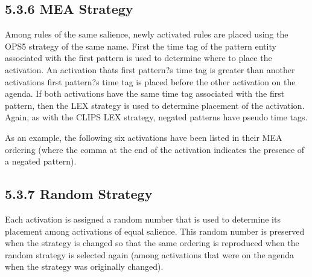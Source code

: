 \documentclass[letterpaper,10pt,english]{sphinxmanual}
\begin{document}
\subsection{5.3.6 MEA Strategy}
\label{\detokenize{defrule:mea-strategy}}
Among rules of the same salience, newly activated rules are placed using
the OPS5 strategy of the same name. First the time tag of the pattern
entity associated with the first pattern is used to determine where to
place the activation. An activation thats first pattern?s time tag is
greater than another activations first pattern?s time tag is placed
before the other activation on the agenda. If both activations have the
same time tag associated with the first pattern, then the LEX strategy
is used to determine placement of the activation. Again, as with the
CLIPS LEX strategy, negated patterns have pseudo time tags.

As an example, the following six activations have been listed in their
MEA ordering (where the comma at the end of the activation indicates the
presence of a negated pattern).

\begin{sphinxVerbatim}[commandchars=\\\{\}]
 
 
 
 
 
 
\end{sphinxVerbatim}


\subsection{5.3.7 Random Strategy}
\label{\detokenize{defrule:random-strategy}}
Each activation is assigned a random number that is used to determine
its placement among activations of equal salience. This random number is
preserved when the strategy is changed so that the same ordering is
reproduced when the random strategy is selected again (among activations
that were on the agenda when the strategy was originally changed).
\end{document}
